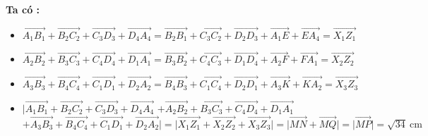 \begin{ex}
{\begin{center}
\begin{tikzpicture}[x=1cm,y=1cm,scale=1,>=stealth]
			\end{tikzpicture}
		\end{center}
		\textbf{Ta có :} 
		\begin{itemize}
			\item $\vec{A_1B_1} + \vec{B_2C_2} + \vec{C_3D_3}+\vec{D_4A_4} = \vec{B_2B_1} + \vec{C_3C_2} + \vec{D_2D_3}+\vec{A_1E} +  \vec{EA_4}=\vec{X_1Z_1}$
			\item $\vec{A_2B_2} + \vec{B_3C_3} + \vec{C_4D_4}+\vec{D_1A_1} = \vec{B_3B_2} + \vec{C_4C_3} + \vec{D_1D_4}+\vec{A_2F} +  \vec{FA_1}=\vec{X_2Z_2}$ 
			\item $\vec{A_3B_3} + \vec{B_4C_4} + \vec{C_1D_1}+\vec{D_2A_2}= \vec{B_4B_3} + \vec{C_1C_4} + \vec{D_2D_1}+\vec{A_3K} +  \vec{KA_2}=\vec{X_3Z_3}$ 
			\item $|\vec{A_1B_1} + \vec{B_2C_2} + \vec{C_3D_3}+\vec{D_4A_4}$ $+\vec{A_2B_2} + \vec{B_3C_3} + \vec{C_4D_4}+\vec{D_1A_1}$ $+\vec{A_3B_3} + \vec{B_4C_4} + \vec{C_1D_1}+\vec{D_2A_2}|=|\vec{X_1Z_1}+\vec{X_2Z_2}+\vec{X_3Z_3}| =|\vec{MN} +\vec{MQ}|=|\vec{MP}|=\sqrt{34}~ \mathrm{cm}$
		\end{itemize}
	}
\end{ex}

